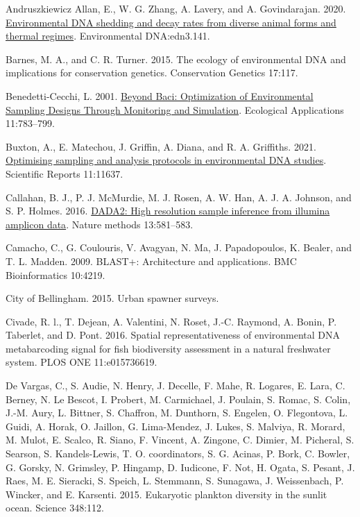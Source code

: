 \documentclass[
]{article}
\newlength{\cslhangindent}
\newlength{\cslentryspacingunit} %
\newenvironment{CSLReferences}[2] %
 {%
  \setlength{\parindent}{0pt}
  \ifodd #1
  \let\oldpar\par
  \def\par{\hangindent=\cslhangindent\oldpar}
  \fi
  \setlength{\parskip}{#2\cslentryspacingunit}
 }%
 {}
\begin{document}
\hypertarget{refs}{}
\begin{CSLReferences}{1}{0}
\leavevmode{}%
Andruszkiewicz Allan, E., W. G. Zhang, A. Lavery, and A. Govindarajan.
2020. \href{https://doi.org/10.1002/edn3.141}{Environmental DNA shedding
and decay rates from diverse animal forms and thermal regimes}.
Environmental DNA:edn3.141.

\leavevmode{}%
Barnes, M. A., and C. R. Turner. 2015. The ecology of environmental DNA
and implications for conservation genetics. Conservation Genetics
17:117.

\leavevmode{}%
Benedetti-Cecchi, L. 2001.
\href{https://doi.org/10.1890/1051-0761(2001)011\%5B0783:BBOOES\%5D2.0.CO;2}{Beyond
Baci: Optimization of Environmental Sampling Designs Through Monitoring
and Simulation}. Ecological Applications 11:783--799.

\leavevmode{}%
Buxton, A., E. Matechou, J. Griffin, A. Diana, and R. A. Griffiths.
2021. \href{https://doi.org/10.1038/s41598-021-91166-7}{Optimising
sampling and analysis protocols in environmental DNA studies}.
Scientific Reports 11:11637.

\leavevmode{}%
Callahan, B. J., P. J. McMurdie, M. J. Rosen, A. W. Han, A. J. A.
Johnson, and S. P. Holmes. 2016.
\href{https://doi.org/10.1038/nmeth.3869}{DADA2: High resolution sample
inference from illumina amplicon data}. Nature methods 13:581--583.

\leavevmode{}%
Camacho, C., G. Coulouris, V. Avagyan, N. Ma, J. Papadopoulos, K.
Bealer, and T. L. Madden. 2009. BLAST+: Architecture and applications.
BMC Bioinformatics 10:4219.

\leavevmode{}%
City of Bellingham. 2015. Urban spawner surveys.

\leavevmode{}%
Civade, R. l., T. Dejean, A. Valentini, N. Roset, J.-C. Raymond, A.
Bonin, P. Taberlet, and D. Pont. 2016. Spatial representativeness of
environmental DNA metabarcoding signal for fish biodiversity assessment
in a natural freshwater system. PLOS ONE 11:e015736619.

\leavevmode{}%
De Vargas, C., S. Audie, N. Henry, J. Decelle, F. Mahe, R. Logares, E.
Lara, C. Berney, N. Le Bescot, I. Probert, M. Carmichael, J. Poulain, S.
Romac, S. Colin, J.-M. Aury, L. Bittner, S. Chaffron, M. Dunthorn, S.
Engelen, O. Flegontova, L. Guidi, A. Horak, O. Jaillon, G. Lima-Mendez,
J. Lukes, S. Malviya, R. Morard, M. Mulot, E. Scalco, R. Siano, F.
Vincent, A. Zingone, C. Dimier, M. Picheral, S. Searson, S.
Kandels-Lewis, T. O. coordinators, S. G. Acinas, P. Bork, C. Bowler, G.
Gorsky, N. Grimsley, P. Hingamp, D. Iudicone, F. Not, H. Ogata, S.
Pesant, J. Raes, M. E. Sieracki, S. Speich, L. Stemmann, S. Sunagawa, J.
Weissenbach, P. Wincker, and E. Karsenti. 2015. Eukaryotic plankton
diversity in the sunlit ocean. Science 348:112.


\end{CSLReferences}
\end{document}
